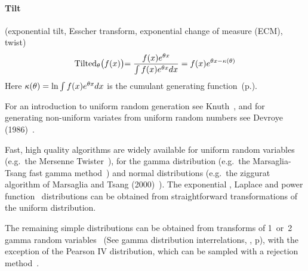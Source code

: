 \paragraph*{Tilt} (exponential tilt, Esscher transform, exponential change of measure (ECM), twist)~\cite{Esscher1932,Siegmund1976} 
\[
\operatorname{Tilted}_\theta\bigr( f(x) \bigl) =  \frac{ f(x) e^{\theta x} }{\int f(x) e^{\theta x} dx }
= f(x) e^{\theta x - \kappa(\theta) }  
\notag
\]
Here $\kappa(\theta)= \ln \int  f(x) e^{\theta x} dx$ is the cumulant generating function~(p.\pageref{CGF}).




\label{sec:random}
For an introduction to uniform random generation see Knuth~\cite{Knuth1997}, and for generating non-uniform variates from uniform random numbers see  Devroye (1986)~\cite{Devroye1986}. 

Fast, high quality algorithms are widely available for uniform random variables (e.g.\ the Mersenne Twister~\cite{Matsumoto1998}), for the gamma distribution (e.g.\ the Marsaglia-Tsang fast gamma method~\cite{Marsaglia2001}) and normal distributions (e.g.\ the ziggurat algorithm of Marsaglia and Tsang (2000)~\cite{Marsaglia2000}). The exponential , Laplace  and power function~ distributions can be obtained from straightforward transformations of the uniform distribution.

The remaining  simple distributions can be obtained from transforms of 1~or~2 gamma random variables~\cite{Devroye1986} (See gamma distribution interrelations, , p\pageref{gammatransforms}), with the exception of the Pearson IV distribution, which can be sampled with a rejection method~\cite{Devroye1986,Heinrich2004}.


